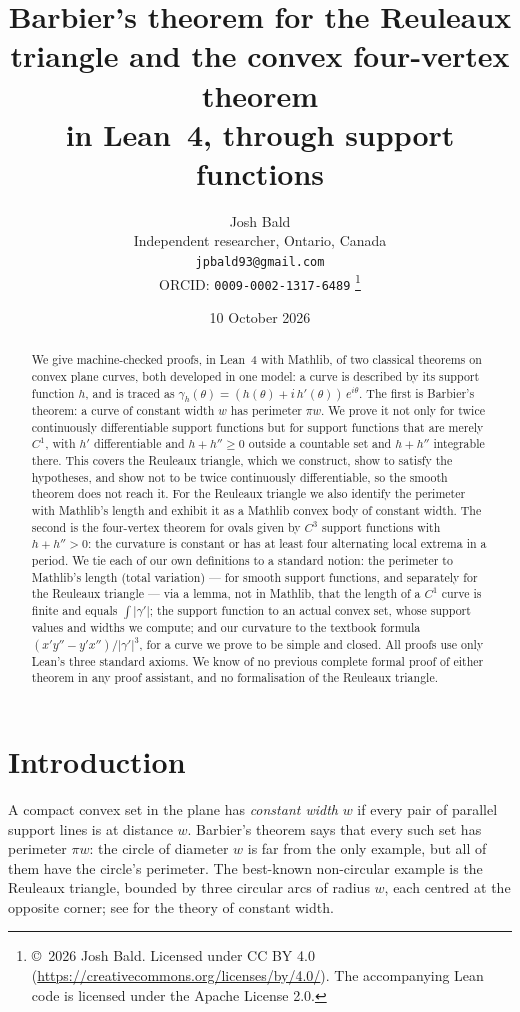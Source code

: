 \documentclass[11pt]{article}
\title{Barbier's theorem for the Reuleaux triangle and the convex four-vertex theorem\\
in Lean~4, through support functions}
\author{Josh Bald\\ \small Independent researcher, Ontario, Canada\\ \small\texttt{jpbald93@gmail.com}\\
\small ORCID: \texttt{0009-0002-1317-6489}
\thanks{\copyright~2026 Josh Bald. Licensed under CC BY 4.0 (\url{https://creativecommons.org/licenses/by/4.0/}). The accompanying Lean code is licensed under the Apache License 2.0.}}
\date{10 October 2026}
\theoremstyle{definition}
\theoremstyle{remark}
\begin{document}
\sloppy
\maketitle

\begin{abstract}
We give machine-checked proofs, in Lean~4 with Mathlib, of two classical theorems on convex plane
curves, both developed in one model: a curve is described by its support function $h$, and is
traced as $\gamma_h(\theta) = (h(\theta) + i\,h'(\theta))\,e^{i\theta}$.
The first is Barbier's theorem: a curve of constant width $w$ has perimeter $\pi w$. We prove it
not only for twice continuously differentiable support functions but for support functions that are
merely $C^1$, with $h'$ differentiable and $h+h''\ge 0$ outside a countable set and $h+h''$
integrable there. This covers the Reuleaux
triangle, which we construct, show to satisfy the hypotheses, and show not to be twice
continuously differentiable, so the smooth theorem does not reach it. For the Reuleaux triangle we also identify the perimeter
with Mathlib's length and exhibit it as a Mathlib convex body of constant width. The second is the four-vertex theorem for
ovals given by $C^3$ support functions with $h+h''>0$: the curvature is constant or has at least four
alternating local extrema in a period. We tie each of our own definitions to a standard notion: the perimeter to
Mathlib's length (total variation) --- for smooth support functions, and separately for the Reuleaux
triangle --- via a lemma, not in Mathlib, that the length of a $C^1$ curve
is finite and equals $\int\lvert\gamma'\rvert$; the support function to an actual convex set, whose
support values and widths we compute; and our curvature to the textbook formula
$(x'y''-y'x'')/\lvert\gamma'\rvert^3$, for a curve we prove to be simple and closed.
All proofs use only Lean's three standard axioms. We know of no previous complete formal proof of
either theorem in any proof assistant, and no formalisation of the Reuleaux triangle.
\end{abstract}

\section{Introduction}

A compact convex set in the plane has \emph{constant width} $w$ if every pair of parallel support
lines is at distance $w$. Barbier's theorem \cite{barbier1860} says that every such set has perimeter $\pi w$:
the circle of diameter $w$ is far from the only example, but all of them have the circle's
perimeter. The best-known non-circular example is the Reuleaux triangle, bounded by three circular
arcs of radius $w$, each centred at the opposite corner; see \cite{martini2019} for the theory of
constant width.
\end{document}
